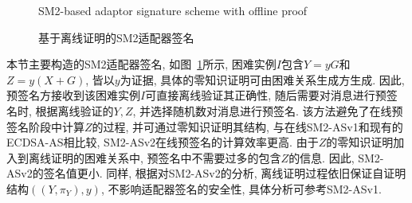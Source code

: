 \documentclass[review]{jcr}
\begin{document}
\begin{figure}
\centering 
{}
\caption{基于离线证明的SM2适配器签名}{SM2-based adaptor signature scheme with offline proof}
\label{SM2-based adaptor signature scheme with offline proof}
\end{figure}

本节主要构造的SM2适配器签名, 如图~\ref{SM2-based adaptor signature scheme with offline proof}所示, 困难实例$I$包含$Y=yG$和$Z=y(X+G)$, 皆以$y$为证据, 具体的零知识证明可由困难关系生成方生成. 因此, 预签名方接收到该困难实例$I$可直接离线验证其正确性, 随后需要对消息进行预签名时, 根据离线验证的$Y, Z$, 并选择随机数对消息进行预签名. 该方法避免了在线预签名阶段中计算$Z$的过程, 并可通过零知识证明其结构, 与在线SM2-ASv1和现有的ECDSA-AS相比较, SM2-ASv2在线预签名的计算效率更高. 由于$Z$的零知识证明加入到离线证明的困难关系中, 预签名中不需要过多的包含$Z$的信息.  因此, SM2-ASv2的签名值更小. 同样, 根据对SM2-ASv2的分析, 离线证明过程依旧保证自证明结构$((Y, \pi_Y),y)$, 不影响适配器签名的安全性, 具体分析可参考SM2-ASv1.
\end{document}
